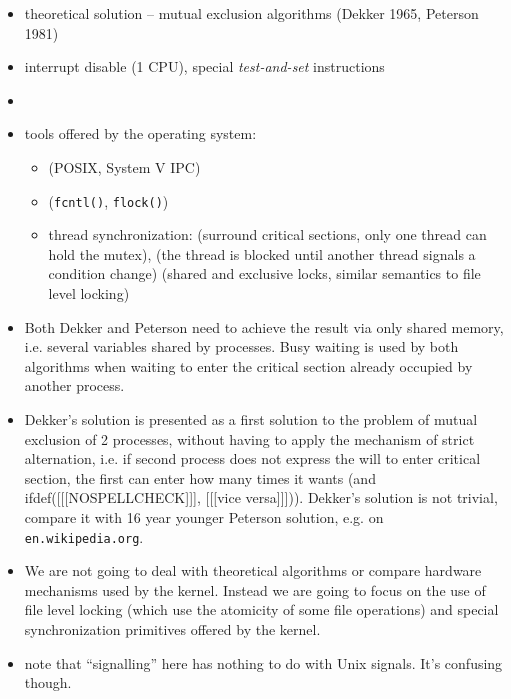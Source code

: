 \begin{slide}
\begin{itemize}
\item theoretical solution -- mutual exclusion algorithms (Dekker
1965, Peterson 1981)
\item interrupt disable (1 CPU), special \emph{test-and-set} instructions
\item {}
\item tools offered by the operating system:
    \begin{itemize}
    \item {} (POSIX, System V IPC)
    \item {} (\texttt{fcntl()}, \texttt{flock()})
    \item thread synchronization:  (surround critical sections,
    only one thread can hold the mutex), 
    (the thread is blocked until another thread signals a condition change)
     (shared and exclusive locks, similar semantics
    to file level locking)
    \end{itemize}
\end{itemize}
\end{slide}

\begin{itemize}
\item Both Dekker and Peterson need to achieve the result via only shared
memory, i.e. several variables shared by processes.  Busy waiting is used by
both algorithms when waiting to enter the critical section already occupied by
another process.
\item Dekker's solution is presented as a first solution to the problem of
mutual exclusion of 2 processes, without having to apply the mechanism of
strict alternation, i.e. if second process does not express the will to enter
critical section, the first can enter how many times it wants
(and ifdef([[[NOSPELLCHECK]]], [[[vice versa]]])).
Dekker's solution is not trivial, compare it with 16 year younger
Peterson solution, e.g. on \texttt{en.wikipedia.org}.
\item We are not going to deal with theoretical algorithms or compare hardware
mechanisms used by the kernel. Instead we are going to focus on the use of
file level locking (which use the atomicity of some file operations)
and special synchronization primitives offered by the kernel.
\item note that ``signalling'' here has nothing to do with Unix signals.  It's
confusing though.
\end{itemize}

